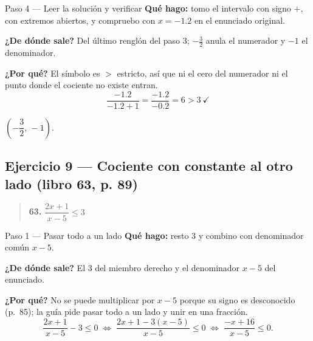 \documentclass[11pt]{article}
\begin{document}
\begin{paso}{Paso 4 --- Leer la solución y verificar}
\textbf{Qué hago:} tomo el intervalo con signo $+$, con extremos abiertos, y compruebo con $x=-1.2$ en el enunciado original.

\textbf{¿De dónde sale?} Del último renglón del paso 3; $-\tfrac32$ anula el numerador y $-1$ el denominador.

\textbf{¿Por qué?} El símbolo es $>$ estricto, así que ni el cero del numerador ni el punto donde el cociente no existe entran.
\[
\frac{-1.2}{-1.2+1}=\frac{-1.2}{-0.2}=6>3 \ \checkmark
\]
\end{paso}

\begin{center}
\end{center}

\begin{resp}
$\left(-\dfrac32,\,-1\right)$.
\end{resp}

\subsection*{Ejercicio 9 --- Cociente con constante al otro lado (libro 63, p. 89)}

\begin{quote}
\textbf{63.} $\dfrac{2x+1}{x-5}\le 3$
\end{quote}

\begin{paso}{Paso 1 --- Pasar todo a un lado}
\textbf{Qué hago:} resto $3$ y combino con denominador común $x-5$.

\textbf{¿De dónde sale?} El $3$ del miembro derecho y el denominador $x-5$ del enunciado.

\textbf{¿Por qué?} No se puede multiplicar por $x-5$ porque su signo es desconocido (p.~85); la guía pide pasar todo a un lado y unir en una fracción.
\[
\frac{2x+1}{x-5}-3\le 0 \;\Longleftrightarrow\; \frac{2x+1-3(x-5)}{x-5}\le 0 \;\Longleftrightarrow\; \frac{-x+16}{x-5}\le 0.
\]
\end{paso}
\end{document}
